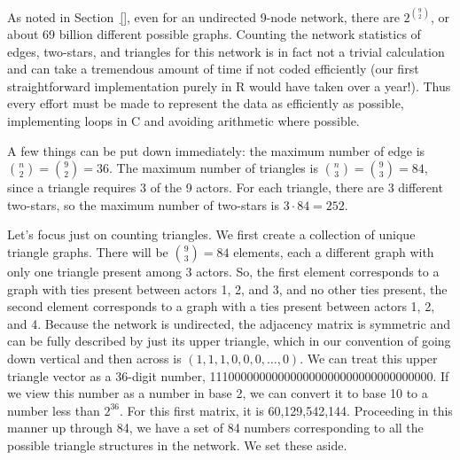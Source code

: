 As noted in Section~\ref{}, even for an undirected 9-node network, 
there are $2^{{9\choose 2}}$, or about 69 billion different possible graphs.
Counting the network statistics of edges, two-stars, and triangles for this
network is in fact not a trivial calculation and can take a tremendous amount of time if not coded efficiently (our first straightforward implementation purely in R would have taken over a year!).  Thus every effort must be made to represent the data as efficiently as possible, implementing loops in C and avoiding arithmetic where possible.

A few things can be put down immediately: the maximum number of edge is ${n \choose 2} = {9 \choose 2} = 36$.  The maximum number of triangles is ${n \choose 3} = {9 \choose 3} = 84$, since a triangle requires 3 of the 9 actors.  For each triangle, there are 3  different two-stars, so the maximum number of two-stars is $3 \cdot 84 = 252$.


Let's focus just on counting triangles.
We first create a collection of unique triangle graphs.  There will be ${9 \choose 3} = 84$ elements, each a different graph with only one triangle present among 3 actors.  So, the first element corresponds to a graph with ties present between actors 1, 2, and 3, and no other ties present, the second element corresponds to a graph with a ties present between actors 1, 2, and 4.  Because the network is undirected, the adjacency matrix is symmetric and can be fully described by just its upper triangle, which in our convention of going down vertical and then across is $(1,1,1,0,0,0, \ldots,0)$.  We can treat this upper triangle vector as a 36-digit number, 111000000000000000000000000000000000.  If we view this number as a number in base 2, we can convert it to base 10 to a number less than $2^{36}$.  For this first matrix, it is 60,129,542,144.  Proceeding in this manner up through 84, we have a set of 84 numbers corresponding to all the possible triangle structures in the network.  We set these aside.

